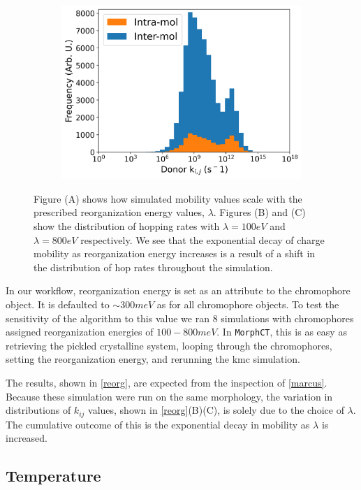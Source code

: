 \begin{figure}
\begin{subfigure}{.5\textwidth}
    \includegraphics[width=\textwidth]{figures/donor_hopping_rate_clusters_reorg800.png}
\end{subfigure}
    \caption{Figure (A) shows how  simulated mobility values scale with the prescribed
    reorganization energy values, $\lambda$. Figures (B) and (C) show the distribution of hopping rates with
    $\lambda = 100eV$ and $\lambda = 800eV$ respectively. We see that the exponential decay of charge mobility as
 reorganization energy increases is a result of a shift in the distribution of hop rates throughout the
    simulation.  
    }
\label{reorg}
\end{figure}

In our workflow, reorganization energy is set as an attribute
to the chromophore object. It is defaulted to ${\sim}300meV$ as for all chromophore
objects.
To test the sensitivity of the algorithm to this value we ran $8$
simulations with chromophores assigned reorganization energies of $100-800meV$.
In \texttt{MorphCT}, this is as easy as retrieving the pickled crystalline system, looping through the chromophores, setting the
reorganization energy, and rerunning the \gls{kmc} simulation. 

The results, shown in
\autoref{reorg}, are expected from the inspection of \autoref{marcus}. Because these simulation were run on
the same morphology, the variation in distributions of $k_{ij}$ values, shown in \autoref{reorg}(B)(C), is
solely due to the choice of $\lambda$. The cumulative outcome of this is the exponential decay in mobility as
$\lambda$ is increased.

\subsection{Temperature}

